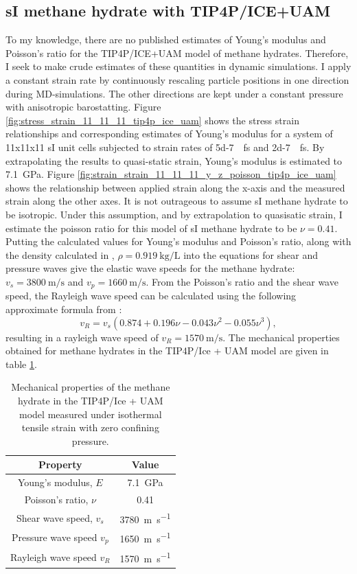\subsection{sI methane hydrate with TIP4P/ICE+UAM}
To my knowledge, there are no published estimates of Young's modulus and Poisson's ratio for the TIP4P/ICE+UAM model of methane hydrates. Therefore, I seek to make crude estimates of these quantities in dynamic simulations. I apply a constant strain rate by continuously rescaling particle positions in one direction during MD-simulations. The other directions are kept under a constant pressure with anisotropic barostatting.
Figure \ref{fig:stress_strain_11_11_11_tip4p_ice_uam} shows the stress strain relationships and corresponding estimates of Young's modulus for a system of 11x11x11 sI unit cells subjected to strain rates of \SI{5d-7}{\per\femto\second} and \SI{2d-7}{\per\femto\second}. By extrapolating the results to quasi-static strain, Young's modulus is estimated to \SI{7.1}{\giga\pascal}. 
Figure \ref{fig:strain_strain_11_11_11_y_z_poisson_tip4p_ice_uam} shows the relationship between applied strain along the x-axis and the measured strain along the other axes. It is not outrageous to assume sI methane hydrate to be isotropic. Under this assumption, and by extrapolation to quasisatic strain, I estimate the poisson ratio for this model of sI methane hydrate to be $\nu = 0.41$. Putting the calculated values for Young's modulus and Poisson's ratio, along with the density calculated in \citet{Ning2010}, $\rho = \SI{0.919}{\kilo\gram\per\liter}$ into the equations for shear and pressure waves give the elastic wave speeds for the methane hydrate: $v_s=\SI{3800}{\meter\per\second}$ and $v_p = \SI{1660}{\meter\per\second}$. From the Poisson's ratio and the shear wave speed, the Rayleigh wave speed can be calculated using the following approximate formula from \cite{0957-4484-16-6-N01}:
\begin{equation}
v_R = v_s(0.874 + 0.196\nu − 0.043\nu^{2} − 0.055\nu^{3}),
\end{equation}
resulting in a rayleigh wave speed of $v_R = \SI{1570}{\meter\per\second}$.
The mechanical properties obtained for methane hydrates in the TIP4P/Ice + UAM model are given in table \ref{tbl:mechanical_from_simulation}.	
\begin{table}
\centering
\caption{Mechanical properties of the methane hydrate in the TIP4P/Ice + UAM model measured under isothermal tensile strain with zero confining pressure.}
\label{tbl:mechanical_from_simulation}
\begin{tabular}{cc}
Property & Value \\
\hline
Young's modulus, $E$ & \SI{7.1}{\giga\pascal} \\
Poisson's ratio, $\nu$ & 0.41 \\
Shear wave speed, $v_s$ & \SI{3780}{\meter\per\second} \\
Pressure wave speed $v_p$ & \SI{1650}{\meter\per\second} \\
Rayleigh wave speed $v_R$ & \SI{1570}{\meter\per\second} \\
\end{tabular}
\end{table}

